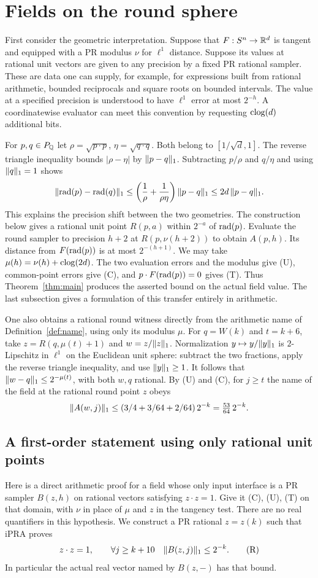 \section{Fields on the round sphere}\label{sec:round}
First consider the geometric interpretation. Suppose that $F:S^n\to\mathbb R^d$
is tangent and equipped with a PR modulus $\nu$ for $\ell^1$ distance.
Suppose its values at rational unit vectors are given to any precision
by a fixed PR rational sampler. These are data one can supply, for
example, for expressions built from rational arithmetic, bounded
reciprocals and square roots on bounded intervals. The value at a
specified precision is understood to have $\ell^1$ error at most
$2^{-h}$. A coordinatewise evaluator can meet this convention by
requesting $\operatorname{clog}(d)$ additional bits.

For $p,q\in P_\mathbb Q$ let $\rho=\sqrt{p\cdot p}$,
$\eta=\sqrt{q\cdot q}$. Both belong to $[1/\sqrt d,1]$.
The reverse triangle inequality bounds $|\rho-\eta|$ by $\lVert p-q\rVert_1$.
Subtracting $p/\rho$ and $q/\eta$ and using $\lVert q\rVert_1=1$ shows
\[
 \lVert \operatorname{rad}(p)-\operatorname{rad}(q)\rVert_1
 \le \left(\frac1{\rho}+\frac1{\rho\eta}\right)\lVert p-q\rVert_1
 \le 2d\,\lVert p-q\rVert_1.
\]
This explains the precision shift between the two geometries. The
construction below gives a rational unit point $R(p,a)$ within
$2^{-a}$ of $\operatorname{rad}(p)$. Evaluate the round sampler to precision $h+2$
at $R(p,\nu(h+2))$ to obtain $A(p,h)$. Its distance from
$F(\operatorname{rad}(p))$ is at most $2^{-(h+1)}$. We may take
$\mu(h)=\nu(h)+\operatorname{clog}(2d)$. The two evaluation errors and the modulus
give (U), common-point errors give (C), and
$p\cdot F(\operatorname{rad}(p))=0$ gives (T). Thus Theorem~\ref{thm:main}
produces the asserted bound on the actual field value. The last
subsection gives a formulation of this transfer entirely in arithmetic.



One also obtains a rational round witness directly from the arithmetic
name of Definition~\ref{def:name}, using only its modulus $\mu$.
For $q=W(k)$ and $t=k+6$, take $z=R(q,\mu(t)+1)$ and $w=z/\lVert z\rVert_1$.
Normalization $y\mapsto y/\lVert y\rVert_1$ is $2$-Lipschitz in $\ell^1$ on
the Euclidean unit sphere: subtract the two fractions, apply the
reverse triangle inequality, and use $\lVert y\rVert_1\ge1$. It follows that
$\lVert w-q\rVert_1\le2^{-\mu(t)}$, with both $w,q$ rational. By (U) and (C),
for $j\ge t$ the name of the field at the rational round point $z$ obeys
\[
       \lVert A(w,j)\rVert_1
        \le (3/4+3/64+2/64)\,2^{-k}
        =\tfrac{53}{64}\,2^{-k}.
\]

\subsection{A first-order statement using only rational unit points}
Here is a direct arithmetic proof for a field whose only input interface
is a PR sampler $B(z,h)$ on rational vectors satisfying $z\cdot z=1$.
Give it (C), (U), (T) on that domain, with $\nu$ in place of $\mu$ and
$z$ in the tangency test. There are no real quantifiers in this
hypothesis. We construct a PR rational $z=z(k)$ such that iPRA proves
\[
 z\cdot z=1,\qquad
 \forall j\ge k+10\quad \lVert B(z,j)\rVert_1\le 2^{-k}.                 \tag{R}
\]
In particular the actual real vector named by $B(z,-)$ has that bound.

